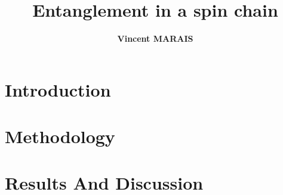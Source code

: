 \documentclass[12pt,a4paper]{article}
\title{Entanglement in a spin chain}
\author{\textbf{Vincent MARAIS}}
\begin{document}
	

\newpage





\newpage
\pagestyle{arabicstyle}
\section{Introduction}



\newpage
	

\section{Methodology}




\newpage 

\section{Results And Discussion}

\end{document}
